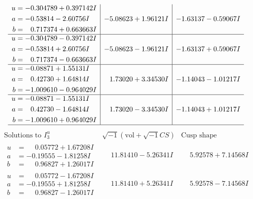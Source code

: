\documentclass[1p]{elsarticle_modified}
\theoremstyle{definition}
\newcommand{\I}{\sqrt{-1}}
\begin{document}
$$\begin{array}{c|c|c}
\begin{aligned}
u &= -0.304789 + 0.397142 I \\
a &= -0.53814 - 2.60756 I \\
b &= \phantom{-}0.717374 + 0.663663 I\end{aligned}
 & -5.08623 + 1.96121 I & -1.63137 - 0.59067 I \\ \hline\begin{aligned}
u &= -0.304789 - 0.397142 I \\
a &= -0.53814 + 2.60756 I \\
b &= \phantom{-}0.717374 - 0.663663 I\end{aligned}
 & -5.08623 - 1.96121 I & -1.63137 + 0.59067 I \\ \hline\begin{aligned}
u &= -0.08871 + 1.55131 I \\
a &= \phantom{-}0.42730 + 1.64814 I \\
b &= -1.009610 - 0.964029 I\end{aligned}
 & \phantom{-}1.73020 + 3.34530 I & -1.14043 - 1.01217 I \\ \hline\begin{aligned}
u &= -0.08871 - 1.55131 I \\
a &= \phantom{-}0.42730 - 1.64814 I \\
b &= -1.009610 + 0.964029 I\end{aligned}
 & \phantom{-}1.73020 - 3.34530 I & -1.14043 + 1.01217 I\\
 \hline 
 \end{array}$$\newpage$$\begin{array}{c|c|c}  
\text{Solutions to }I^u_{3}& \I (\text{vol} + \sqrt{-1}CS) & \text{Cusp shape}\\
 \hline 
\begin{aligned}
u &= \phantom{-}0.05772 + 1.67208 I \\
a &= -0.19555 - 1.81258 I \\
b &= \phantom{-}0.96827 + 1.26017 I\end{aligned}
 & \phantom{-}11.81410 - 5.26341 I & \phantom{-}5.92578 + 7.14568 I \\ \hline\begin{aligned}
u &= \phantom{-}0.05772 - 1.67208 I \\
a &= -0.19555 + 1.81258 I \\
b &= \phantom{-}0.96827 - 1.26017 I\end{aligned}
 & \phantom{-}11.81410 + 5.26341 I & \phantom{-}5.92578 - 7.14568 I \\ \hline\begin{aligned}

\end{aligned}
\end{array}$$
\end{document}
